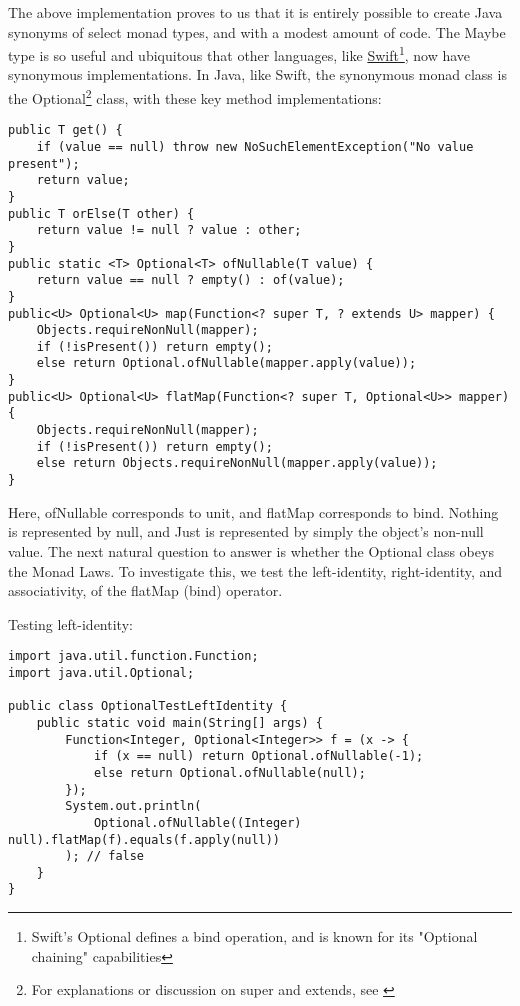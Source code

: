 The above implementation proves to us that it is entirely possible to create Java synonyms of select monad types, and with a modest amount of code. The Maybe type is so useful and ubiquitous that other languages, like \href{https://docs.swift.org/swift-book/LanguageGuide/TheBasics.html#ID330}{Swift}\footnote{Swift's Optional defines a bind operation, and is known for its "Optional chaining" capabilities}, now have synonymous implementations. In Java, like Swift, the synonymous monad class is the Optional\footnote{For explanations or discussion on super and extends, see \cite{bert-f-generics}} \cite{java-optional-source} class, with these key method implementations:

\begin{verbatim}
public T get() {
    if (value == null) throw new NoSuchElementException("No value present");
    return value;
}
public T orElse(T other) {
    return value != null ? value : other;
}
public static <T> Optional<T> ofNullable(T value) {
    return value == null ? empty() : of(value);
}
public<U> Optional<U> map(Function<? super T, ? extends U> mapper) {
    Objects.requireNonNull(mapper);
    if (!isPresent()) return empty();
    else return Optional.ofNullable(mapper.apply(value));
}
public<U> Optional<U> flatMap(Function<? super T, Optional<U>> mapper) {
    Objects.requireNonNull(mapper);
    if (!isPresent()) return empty();
    else return Objects.requireNonNull(mapper.apply(value));
}
\end{verbatim}

Here, ofNullable corresponds to unit, and flatMap corresponds to bind. Nothing is represented by null, and Just is represented by simply the object's non-null value. The next natural question to answer is whether the Optional class obeys the Monad Laws. To investigate this, we test \cite{optional-breaks-monad-laws} the left-identity, right-identity, and associativity, of the flatMap (bind) operator.

Testing left-identity:
\begin{verbatim}
import java.util.function.Function;
import java.util.Optional;

public class OptionalTestLeftIdentity {
    public static void main(String[] args) {
        Function<Integer, Optional<Integer>> f = (x -> {
            if (x == null) return Optional.ofNullable(-1);
            else return Optional.ofNullable(null);
        });
        System.out.println(
            Optional.ofNullable((Integer) null).flatMap(f).equals(f.apply(null))
        ); // false
    }    
}
\end{verbatim}

